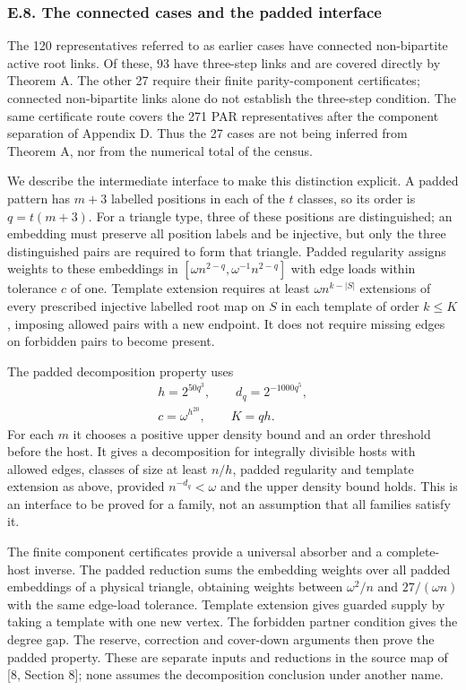 \documentclass[english,11pt,a4paper]{article}
\newcounter{none}
\begin{document}
\bigskip

\subsubsection{E.8. The connected cases and the padded interface}\label{e.8.-the-connected-cases-and-the-padded-interface}

The 120 representatives referred to as earlier cases have connected non-bipartite active root links. Of these, 93 have three-step links and are covered directly by Theorem A. The other 27 require their finite parity-component certificates; connected non-bipartite links alone do not establish the three-step condition. The same certificate route covers the 271 PAR representatives after the component separation of Appendix D. Thus the 27 cases are not being inferred from Theorem A, nor from the numerical total of the census.

We describe the intermediate interface to make this distinction explicit. A padded pattern has \(m+3\) labelled positions in each of the \(t\) classes, so its order is \(q=t(m+3)\). For a triangle type, three of these positions are distinguished; an embedding must preserve all position labels and be injective, but only the three distinguished pairs are required to form that triangle. Padded regularity assigns weights to these embeddings in \([\omega n^{2-q},\omega^{-1}n^{2-q}]\) with edge loads within tolerance \(c\) of one. Template extension requires at least \(\omega n^{k-|S|}\) extensions of every prescribed injective labelled root map on \(S\) in each template of order \(k\le K\), imposing allowed pairs with a new endpoint. It does not require missing edges on forbidden pairs to become present.

The padded decomposition property uses \[\begin{gathered}
h=2^{50q^3},\qquad d_q=2^{-1000q^5},\\
c=\omega^{h^{20}},\qquad K=qh.
\end{gathered}\] For each \(m\) it chooses a positive upper density bound and an order threshold before the host. It gives a decomposition for integrally divisible hosts with allowed edges, classes of size at least \(n/h\), padded regularity and template extension as above, provided \(n^{-d_q}<\omega\) and the upper density bound holds. This is an interface to be proved for a family, not an assumption that all families satisfy it.

The finite component certificates provide a universal absorber and a complete-host inverse. The padded reduction sums the embedding weights over all padded embeddings of a physical triangle, obtaining weights between \(\omega^2/n\) and \(27/(\omega n)\) with the same edge-load tolerance. Template extension gives guarded supply by taking a template with one new vertex. The forbidden partner condition gives the degree gap. The reserve, correction and cover-down arguments then prove the padded property. These are separate inputs and reductions in the source map of {[}8, Section 8{]}; none assumes the decomposition conclusion under another name.
\end{document}
